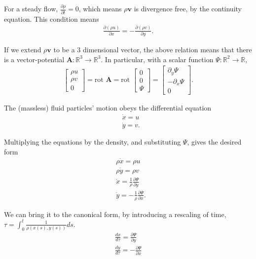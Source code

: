 \begin{solution}[8.2]
For a steady flow, $\frac{\partial \rho}{\partial t} = 0$, which means $\rho \mathbf{v}$ is divergence free, by the continuity equation. This condition means
\begin{align}
\frac{\partial(\rho u)}{\partial x} = -\frac{\partial (\rho v)}{\partial y}.
\end{align}

If we extend $\rho \mathbf{v}$ to be a 3 dimensional vector, the above relation means that there is a vector-potential $\mathbf{A}:\mathbb{R}^3\to \mathbb{R}^3$. In particular, with a scalar function $\Psi:\mathbb{R}^2 \to \mathbb{R}$,
\begin{align}
\begin{bmatrix}\rho u \\ \rho v\\ 0 \end{bmatrix}=\text{rot } \mathbf{A} = \text{rot } \begin{bmatrix} 0 \\ 0 \\ \Psi \end{bmatrix} = \begin{bmatrix} \partial_y \Psi \\ -\partial_x \Psi \\ 0 \end{bmatrix}. 
\end{align}

The (massless) fluid particles' motion obeys the differential equation
\begin{align}
    &\dot{x} = u \\
    &\dot{y} = v.
\end{align}

Multiplying the equations by the density, and substituting $\Psi$, gives the desired form
\begin{align}
    &\rho\dot{x} = \rho u \\
    &\rho\dot{y} = \rho v \\
    &\dot{x} = \frac{1}{\rho}\frac{\partial \Psi}{\partial y}\\
    &\dot{y} = -\frac{1}{\rho}\frac{\partial \Psi}{\partial x}. 
\end{align}

We can bring it to the canonical form, by introducing a rescaling of time, $\tau = \int_0^t\frac{1}{\rho(x(s),y(s))}ds$.
\begin{align}
    \frac{d x}{d\tau} = \frac{\partial \Psi}{\partial y} \\
    \frac{d y}{d\tau} = -\frac{\partial \Psi}{\partial x} 
\end{align}



\end{solution}
